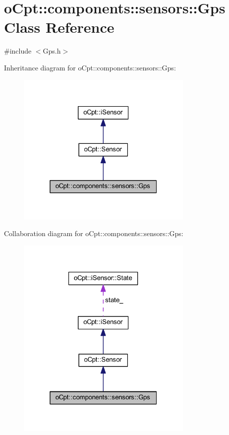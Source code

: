 \hypertarget{classo_cpt_1_1components_1_1sensors_1_1_gps}{}\section{o\+Cpt\+:\+:components\+:\+:sensors\+:\+:Gps Class Reference}
\label{classo_cpt_1_1components_1_1sensors_1_1_gps}


{\ttfamily \#include $<$Gps.\+h$>$}



Inheritance diagram for o\+Cpt\+:\+:components\+:\+:sensors\+:\+:Gps\+:\nopagebreak
\begin{figure}[H]
\begin{center}
\leavevmode
\includegraphics[width=241pt]{classo_cpt_1_1components_1_1sensors_1_1_gps__inherit__graph}
\end{center}
\end{figure}


Collaboration diagram for o\+Cpt\+:\+:components\+:\+:sensors\+:\+:Gps\+:\nopagebreak
\begin{figure}[H]
\begin{center}
\leavevmode
\includegraphics[width=241pt]{classo_cpt_1_1components_1_1sensors_1_1_gps__coll__graph}
\end{center}
\end{figure}
